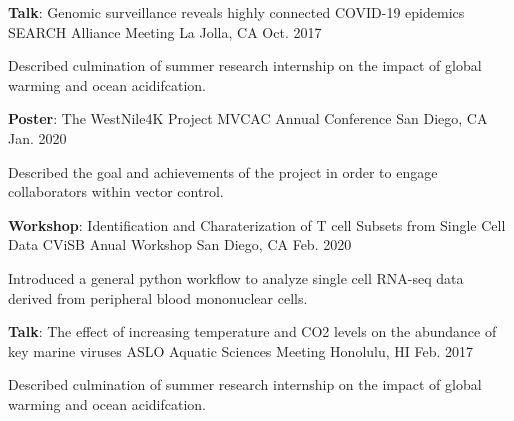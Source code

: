 
\begin{cventries}
    \cventry
    {\textbf{Talk}: Genomic surveillance reveals highly connected COVID-19 epidemics} %
    {SEARCH Alliance Meeting} %
    {La Jolla, CA} %
    {Oct. 2017} %
    {
      \begin{cvitems} %
        \item {Described culmination of summer research internship on the impact of global warming and ocean acidifcation.}
      \end{cvitems}
    }
    
  \cventry
    {\textbf{Poster}: The WestNile4K Project} %
    {MVCAC Annual Conference} %
    {San Diego, CA} %
    {Jan. 2020} %
    {
      \begin{cvitems} %
        \item {Described the goal and achievements of the project in order to engage collaborators within vector control.}
      \end{cvitems}
    }

  \cventry
    {\textbf{Workshop}: Identification and Charaterization of T cell Subsets from Single Cell Data} %
    {CViSB Anual Workshop} %
    {San Diego, CA} %
    {Feb. 2020} %
    {
      \begin{cvitems} %
        \item {Introduced a general python workflow to analyze single cell RNA-seq data derived from peripheral blood mononuclear cells.}
      \end{cvitems}
    }

  \cventry
    {\textbf{Talk}: The effect of increasing temperature and CO2 levels on the abundance of key marine viruses} %
    {ASLO Aquatic Sciences Meeting} %
    {Honolulu, HI} %
    {Feb. 2017} %
    {
      \begin{cvitems} %
        \item {Described culmination of summer research internship on the impact of global warming and ocean acidifcation.}
      \end{cvitems}
    }

\end{cventries}
